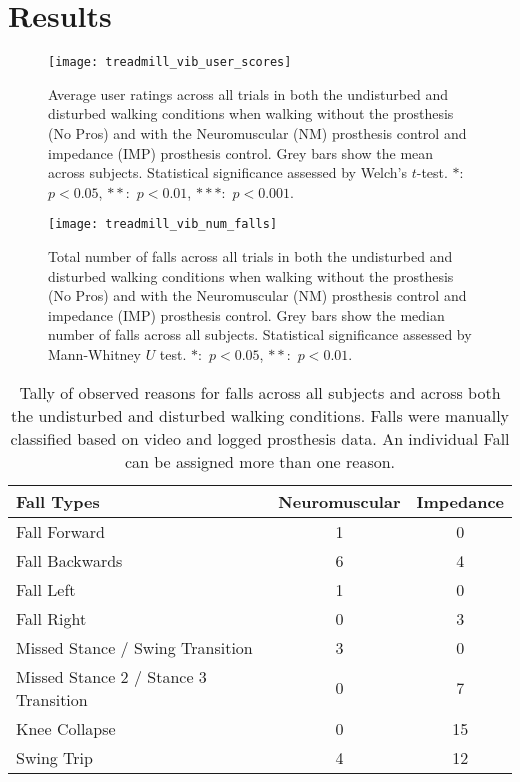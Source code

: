 \section{Results}
\begin{figure}[h]
    \centering 
    \texttt{[image: treadmill\_vib\_user\_scores]}
    \caption{Average user ratings across all trials in both the undisturbed and
    disturbed walking conditions when walking without the prosthesis (No Pros)
    and with the Neuromuscular (NM) prosthesis control and impedance (IMP)
    prosthesis control. Grey bars show the mean across subjects.  Statistical
    significance assessed by Welch's $t$-test. $*$:~$p < 0.05$, $**$:~$p <
    0.01$, $***$:~$p < 0.001$.}\label{fig:treadmill_user_ratings}
\end{figure}

\begin{figure}[h]
    \centering 
    \texttt{[image: treadmill\_vib\_num\_falls]}
    \caption{Total number of falls across all trials in both the undisturbed and
    disturbed walking conditions when walking without the prosthesis (No Pros)
    and with the Neuromuscular (NM) prosthesis control and impedance (IMP)
    prosthesis control. Grey bars show the median number of falls across all
    subjects. Statistical significance assessed by Mann-Whitney $U$ test.
    $*$:~$p < 0.05$, $**$:~$p < 0.01$.}\label{fig:treadmill_exp_falls}
\end{figure}

\begin{table}[h]
  \begin{center}
    \begin{tabular}{lcc}
      Fall Types & Neuromuscular & Impedance \\
      \midrule
      Fall Forward &  1 &  0 \\
      Fall Backwards &  6 &  4 \\
      Fall Left &  1 &  0 \\
      Fall Right &  0 &  3 \\
      Missed Stance / Swing Transition &  3 &  0 \\
      Missed Stance 2 / Stance 3 Transition &  0 &  7 \\
      Knee Collapse & 0 & 15 \\
      Swing Trip & 4 & 12 \\
    \end{tabular}
  \end{center}
  \caption{Tally of observed reasons for falls across all subjects and across
  both the undisturbed and disturbed walking conditions. Falls were manually
  classified based on video and logged prosthesis data. An individual Fall can
  be assigned more than one reason.}\label{tab:treadmill_exp_fall_reasons}
\end{table}

